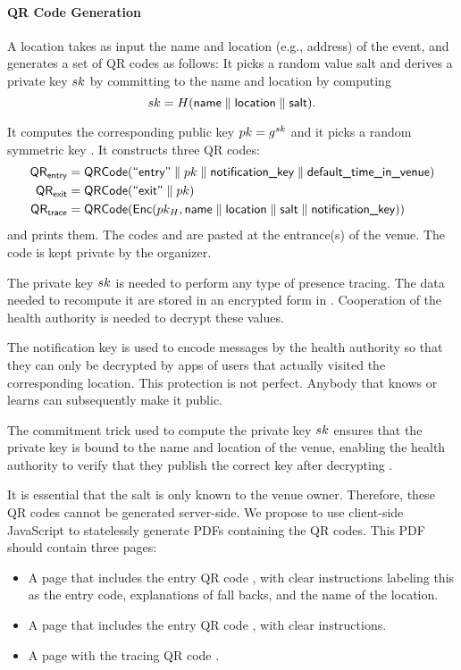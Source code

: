 \paragraph{QR Code Generation} A location takes as input the name and location (e.g., address) of the event, and generates a set of QR codes as follows:
It picks a random value salt and derives a private key $sk$ by committing to the name and location by computing
\begin{equation*}
	sk = H( \textsf{name} \parallel \textsf{location} \parallel \textsf{salt} ).
\end{equation*}

It computes the corresponding public key $pk = g^{sk}$ and it picks a random symmetric key \notificationkey.
It constructs three QR codes:
  \begin{align*}
    \textsf{QR}_{\textsf{entry}} &= \textsf{QRCode}(\textsf{``entry''} \parallel pk \parallel \textsf{notification\_key} \parallel \textsf{default\_time\_in\_venue}) \\
    \textsf{QR}_{\textsf{exit}} &= \textsf{QRCode}(\textsf{``exit''} \parallel pk ) \\
    \textsf{QR}_{\textsf{trace}} &= \textsf{QRCode}(  \textsf{Enc}(pk_{H}, \textsf{name} \parallel \textsf{location} \parallel \textsf{salt} \parallel \textsf{notification\_key})  )
  \end{align*}
and prints them. The codes \qrentry and \qrexit are pasted at the entrance(s) of the venue. The code \qrtrace is kept private by the organizer.

The private key $sk$ is needed to perform any type of presence tracing. The data needed to recompute it are stored in an encrypted form in \qrtrace. Cooperation of the health authority is needed to decrypt these values.

The notification key \notificationkey is used to encode messages by the health authority so that they can only be decrypted by apps of users that actually visited the corresponding location. This protection is not perfect. Anybody that knows or learns \notificationkey can subsequently make it public.

The commitment trick used to compute the private key $sk$ ensures that the private key is bound to the name and location of the venue, enabling the health authority to verify that they publish the correct key after decrypting \qrtrace.

 It is essential that the salt is only known to the venue owner. Therefore, these QR codes cannot be generated server-side. We propose to use client-side JavaScript to statelessly generate PDFs containing the QR codes. This PDF should contain three pages:
\begin{itemize}
\item A page that includes the entry QR code \qrentry, with clear instructions labeling this as the entry code, explanations of fall backs, and the name of the location.
\item A page that includes the entry QR code \qrexit, with clear instructions.
\item A page with the tracing QR code \qrtrace.
\end{itemize}


